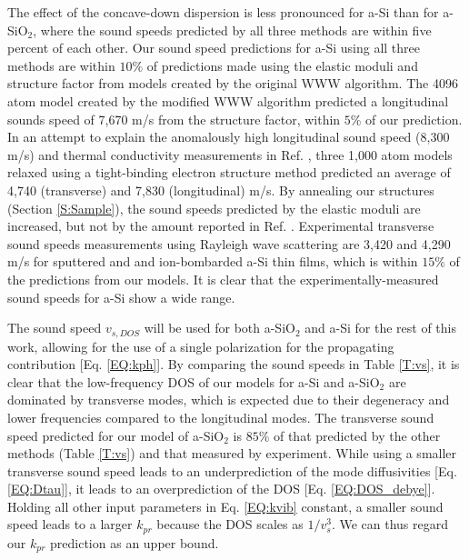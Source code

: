 \documentclass[aps,prb,onecolumn,preprint,superscriptaddress,footinbib,amsmath,amssymb,floatfix]{revtex4}
\begin{document}
The effect of the concave-down dispersion
is less pronounced for a-Si than for a-SiO$_2$, where the sound speeds 
predicted by all three methods are within five percent of each other. 
Our sound speed predictions for a-Si using all three methods
are within $10\%$ of predictions made using the elastic moduli
\cite{kluge_elastic_1988,feldman_elastic_1991} 
and structure factor\cite{feldman_calculations_2002} 
from models created by the original WWW algorithm.
\cite{wooten_computer_1985} 
The 4096 atom model created by the modified WWW algorithm 
\cite{barkema_high-quality_2000} predicted a longitudinal sounds 
speed of 7,670 m/s from the structure factor,
\cite{christie_vibrational_2007} within $5\%$ of our prediction. 
In an attempt to explain the 
anomalously high longitudinal sound speed (8,300 m/s) and 
thermal conductivity measurements in Ref. , 
three 1,000 atom models relaxed using a tight-binding electron 
structure method predicted an average of 4,740 (transverse) and 
7,830 (longitudinal) m/s.\cite{liu_high_2009} By annealing our 
structures (Section \ref{S:Sample}), 
the sound speeds predicted by the elastic moduli are increased, but 
not by the amount reported in Ref. . 
Experimental transverse sound speeds measurements using Rayleigh wave 
scattering are 3,420 and 4,290 m/s for sputtered and 
and ion-bombarded a-Si thin films,\cite{vacher_attenuation_1980} which 
is within $15\%$ of the predictions from our models. It is clear that 
the experimentally-measured sound speeds for a-Si show a wide range.

The sound speed $v_{s,DOS}$ will be used for both 
a-SiO$_2$ and a-Si for the rest of this work, allowing 
for the use of a single polarization for the propagating 
contribution [Eq. \eqref{EQ:kph}]. 
By comparing the sound speeds in Table \ref{T:vs}, it is clear that 
the low-frequency DOS of our models for a-Si and a-SiO$_2$ are 
dominated by 
transverse modes, which is expected due to their degeneracy and lower 
frequencies compared to the longitudinal modes.  
The transverse sound speed predicted for our model of 
a-SiO$_2$ is $85\%$ of that predicted by 
the other methods (Table \ref{T:vs}) and that measured by experiment.
\cite{vacher_ultrasonic_1981,benassi_evidence_1996,
ruocco_high-frequency_2001,polian_elastic_2002,
ruzicka_evidence_2004} 
While using a smaller transverse sound speed 
leads to an underprediction of the
mode diffusivities [Eq. \eqref{EQ:Dtau}], it leads to an
overprediction of the DOS [Eq. \eqref{EQ:DOS_debye}]. 
Holding all other input parameters in Eq. \eqref{EQ:kvib} constant,
a smaller sound speed leads to a larger $k_{pr}$ 
because the DOS scales as $1/v^3_{s}$. We can thus regard
our $k­_{pr}$ prediction as an upper bound.
\end{document}

